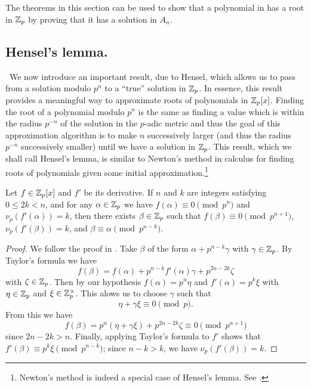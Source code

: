 The theorems in this section can be used to show that a polynomial in has a root in \(\mathbb{Z}_p\) by proving that it has a solution in \(A_n\). \cite{weismann2006annotations}


\subsection{Hensel's lemma.}~We now introduce an important result, due to Hensel, which allows us to pass from a solution modulo \(p^n\) to a ``true'' solution in \(\mathbb{Z}_p\). In essence, this result provides a meaningful way to approximate roots of polynomials in \(\mathbb{Z}_p[x]\). Finding the root of a polynomial modulo \(p^n\) is the same as finding a value which is within the radius \(p^{-n}\) of the solution in the \(p\)-adic metric \cite{weismann2006annotations} and thus the goal of this approximation algorithm is to make \(n\) successively larger (and thus the radius \(p^{-n}\) successively smaller) until we have a solution in \(\mathbb{Z}_p\). This result, which we shall call Hensel's lemma, is similar to Newton's method in calculus for finding roots of polynomials given some initial approximation.\footnote{Newton's method is indeed a special case of Hensel's lemma. See \cite{von1984hensel}.}

\begin{lemma}
    Let \(f \in \mathbb{Z}_p[x]\) and \(f'\) be its derivative. If \(n\) and \(k\) are integers satisfying \(0 \leq 2k < n\), and for any \(\alpha \in \mathbb{Z}_p\) we have \(f(\alpha) \equiv 0 \pmod{p^n}\) and \(\nu_p(f'(\alpha)) = k\), then there exists \(\beta \in \mathbb{Z}_p\) such that \(f(\beta) \equiv 0 \pmod{p^{n + 1}}\), \(\nu_p(f'(\beta)) = k\), and \(\beta \equiv \alpha \pmod{p^{n-k}}\).
\end{lemma}

\begin{proof}
    We follow the proof in \cite{serre2012course}. Take \(\beta\) of the form \(\alpha + p^{n-k}\gamma\) with \(\gamma \in \mathbb{Z}_p\). By Taylor's formula we have
    \[
        f(\beta) = f(\alpha) + p^{n-k}f'(\alpha)\gamma + p^{2n-2k}\zeta
    \]
    with \(\zeta \in \mathbb{Z}_p\). Then by our hypothesis \(f(\alpha) = p^n\eta\) and \(f'(\alpha) = p^k\xi\) with \(\eta \in \mathbb{Z}_p\) and \(\xi \in \mathbb{Z}_p^{\times}\). This alows us to choose \(\gamma\) such that
    \[
        \eta + \gamma\xi \equiv 0 \pmod{p}.
    \]
    From this we have
    \[
        f(\beta) = p^n(\eta + \gamma\xi) + p^{2n-2k}\zeta \equiv 0 \pmod{p^{n+1}}
    \]
    since \(2n - 2k > n\). Finally, applying Taylor's formula to \(f'\) shows that \(f'(\beta) \equiv p^k \xi \pmod{p^{n-k}}\); since \(n - k > k\), we have \(\nu_p(f'(\beta)) = k\).
\end{proof}

